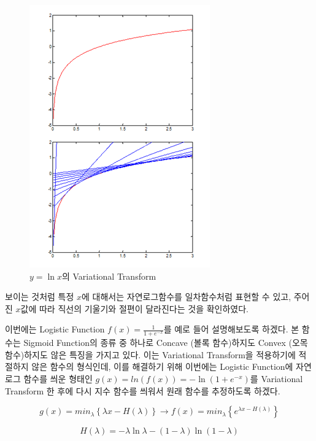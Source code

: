 \documentclass[draft=false]{oblivoir}
\begin{document}
\begin{figure}[ht] \centering 
\includegraphics[scale=0.6]{fig11_1.png} 
\caption{ $y = \ln x$의 Variational Transform}
\label{fig:11-1}
\end{figure}

보이는 것처럼 특정 $x$에 대해서는 자연로그함수를 일차함수처럼 표현할 수 있고, 주어진 $x$값에 따라 직선의 기울기와 절편이 달라진다는 것을 확인하였다.

이번에는 Logistic Function $f(x) = \frac{1}{1+e^{-x}}$를 예로 들어 설명해보도록 하겠다. 본 함수는 Sigmoid Function의 종류 중 하나로 Concave (볼록 함수)하지도 Convex (오목 함수)하지도 않은 특징을 가지고 있다. 이는 Variational Transform을 적용하기에 적절하지 않은 함수의 형식인데, 이를 해결하기 위해 이번에는 Logistic Function에 자연로그 함수를 씌운 형태인 $g(x) =ln(f(x))=-\ln (1+e^{-x})$를 Variational Transform 한 후에 다시 지수 함수를 씌워서 원래 함수를 추정하도록 하겠다. 

\begin{equation}
g(x) = min_{\lambda}\left\{{\lambda x -H(\lambda)}\right\}
 \rightarrow 
f(x) = min_{\lambda}\left\{ e^{\lambda x -H(\lambda)}\right\}
\label{eq:11-2-4-1}
\end{equation}

\begin{equation}
H(\lambda) = -\lambda \ln \lambda-(1-\lambda) \ln (1-\lambda)
\label{eq:11-2-5-1}
\end{equation}
\end{document}
